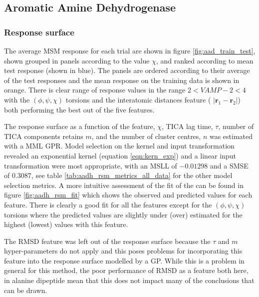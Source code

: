\subsection{Aromatic Amine Dehydrogenase}\label{subsec:aadh}
\subsubsection{Response surface}\label{subsubsec:aadh_rsm}
The average MSM response for each trial are shown in figure \ref{fig:aad_train_test}, shown grouped in panels according to the value $\chi$,  and ranked according to mean test response (shown in blue). The panels are ordered according to their average of the test responses and the mean response on the training data is shown in orange. There is clear range of response values in the range $2 < VAMP-2 < 4$ with the $(\phi, \psi, \chi)$ torsions and the interatomic distances feature ( $\left|\mathbf{r}_{1}-\mathbf{r}_{2}\right|$) both performing the best out of the five features. 

The response surface as a function of the feature, $\chi$, TICA lag time, $\tau$, number of TICA components retains $m$, and the number of cluster centres, $n$ was estimated with a MML GPR. Model selection on the kernel and input transformation revealed an exponential kernel (equation \ref{eqn:kern_exp}) and a linear input transformation were most appropriate, with an MSLL of $-0.01298$ and a SMSE of $0.3087$, see table \ref{tab:aadh_rsm_metrics_all_data} for the other model selection metrics. A more intuitive assessment of the fit of the can be found in figure  \ref{fig:aadh_rsm_fit} which shows the observed and predicted values for each feature. There is clearly a good fit for all the features except for the $(\phi, \psi, \chi)$ torsions where the predicted values are slightly under (over) estimated for the highest (lowest) values with this feature. 

The RMSD feature was left out of the response surface because the $\tau$ and $m$ hyper-parameters do not apply and this poses problems for incorporating this feature into the response surface modelled by a GP.  While this is a problem in general for this method, the poor performance of RMSD as a feature both here, in alanine dipeptide mean that this does not impact many of the conclusions that can be drawn. 

